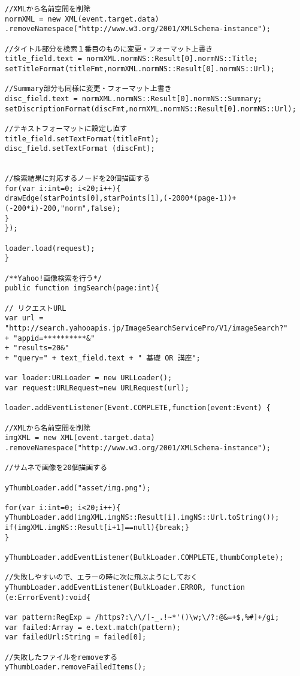 {\begin{verbatim}
//XMLから名前空間を削除
normXML = new XML(event.target.data)
.removeNamespace("http://www.w3.org/2001/XMLSchema-instance");

//タイトル部分を検索１番目のものに変更・フォーマット上書き
title_field.text = normXML.normNS::Result[0].normNS::Title;
setTitleFormat(titleFmt,normXML.normNS::Result[0].normNS::Url);

//Summary部分も同様に変更・フォーマット上書き
disc_field.text = normXML.normNS::Result[0].normNS::Summary;
setDiscriptionFormat(discFmt,normXML.normNS::Result[0].normNS::Url);

//テキストフォーマットに設定し直す
title_field.setTextFormat(titleFmt);
disc_field.setTextFormat (discFmt);


//検索結果に対応するノードを20個描画する
for(var i:int=0; i<20;i++){
drawEdge(starPoints[0],starPoints[1],(-2000*(page-1))+(-200*i)-200,"norm",false);
}
});

loader.load(request);
}

/**Yahoo!画像検索を行う*/
public function imgSearch(page:int){

// リクエストURL
var url = "http://search.yahooapis.jp/ImageSearchServicePro/V1/imageSearch?"
+ "appid=**********&"
+ "results=20&"
+ "query=" + text_field.text + " 基礎 OR 講座";

var loader:URLLoader = new URLLoader();
var request:URLRequest=new URLRequest(url);

loader.addEventListener(Event.COMPLETE,function(event:Event) {

//XMLから名前空間を削除
imgXML = new XML(event.target.data)
.removeNamespace("http://www.w3.org/2001/XMLSchema-instance");

//サムネで画像を20個描画する

yThumbLoader.add("asset/img.png");

for(var i:int=0; i<20;i++){
yThumbLoader.add(imgXML.imgNS::Result[i].imgNS::Url.toString());
if(imgXML.imgNS::Result[i+1]==null){break;}
}

yThumbLoader.addEventListener(BulkLoader.COMPLETE,thumbComplete);

//失敗しやすいので、エラーの時に次に飛ぶようにしておく
yThumbLoader.addEventListener(BulkLoader.ERROR, function (e:ErrorEvent):void{

var pattern:RegExp = /https?:\/\/[-_.!~*'()\w;\/?:@&=+$,%#]+/gi;
var failed:Array = e.text.match(pattern);
var failedUrl:String = failed[0];

//失敗したファイルをremoveする
yThumbLoader.removeFailedItems();


\end{verbatim}}
